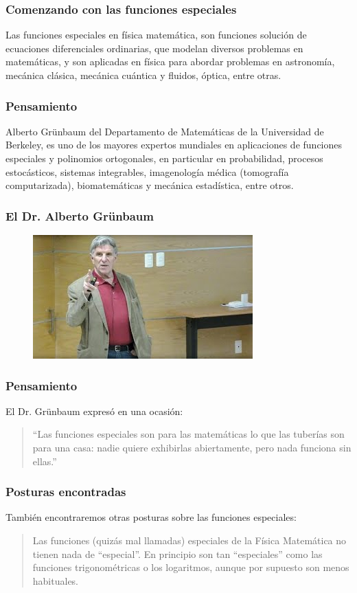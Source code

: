 \documentclass[12pt]{beamer}
\begin{document}
\begin{frame}
\frametitle{Comenzando con las funciones especiales}
Las funciones especiales en física matemática, son funciones solución de ecuaciones diferenciales ordinarias, que modelan diversos problemas en matemáticas, y son aplicadas en física para abordar problemas en astronomía, mecánica clásica, mecánica cuántica y fluidos, óptica, entre otras.
\end{frame}
\begin{frame}
\frametitle{Pensamiento}
Alberto Grünbaum del Departamento de Matemáticas de la Universidad de Berkeley, es uno de los mayores expertos mundiales en aplicaciones de funciones especiales y polinomios ortogonales, \pause en particular en probabilidad, procesos estocásticos, sistemas integrables, imagenología médica (tomografía computarizada), biomatemáticas y mecánica estadística, entre otros.
\end{frame}
\begin{frame}
\frametitle{El Dr. Alberto Grünbaum}
\begin{figure}
  \centering
  \includegraphics[scale=0.5]{Imagenes/Alberto_Grunbaum.jpg}
\end{figure}
\end{frame}
\begin{frame}
\frametitle{Pensamiento}
El Dr. Grünbaum expresó en una ocasión:
\\
\bigskip
\pause
\begin{quote}
\enquote{Las funciones especiales son para las matemáticas lo que las tuberías son para una casa: nadie quiere exhibirlas abiertamente, pero nada funciona sin ellas.}
\end{quote}
\end{frame}
\begin{frame}
\frametitle{Posturas encontradas}
También encontraremos otras posturas sobre las funciones especiales:
\pause
\begin{quote}
Las funciones (quizás mal llamadas) especiales de la Física Matemática no tienen nada de \enquote{especial}. En principio son tan \enquote{especiales} como las funciones trigonométricas o los logaritmos, aunque por supuesto son menos habituales.
\end{quote}
\end{frame}
\end{document}
